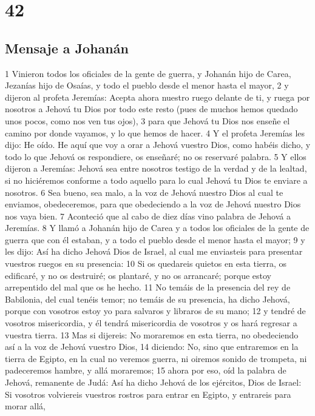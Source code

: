 \chapter{42}

\section*{Mensaje a Johanán}

1 Vinieron todos los oficiales de la gente de guerra, y Johanán hijo de Carea, Jezanías hijo de Osaías, y todo el pueblo desde el menor hasta el mayor,
2 y dijeron al profeta Jeremías: Acepta ahora nuestro ruego delante de ti, y ruega por nosotros a Jehová tu Dios por todo este resto (pues de muchos hemos quedado unos pocos, como nos ven tus ojos),
3 para que Jehová tu Dios nos enseñe el camino por donde vayamos, y lo que hemos de hacer.
4 Y el profeta Jeremías les dijo: He oído. He aquí que voy a orar a Jehová vuestro Dios, como habéis dicho, y todo lo que Jehová os respondiere, os enseñaré; no os reservaré palabra.
5 Y ellos dijeron a Jeremías: Jehová sea entre nosotros testigo de la verdad y de la lealtad, si no hiciéremos conforme a todo aquello para lo cual Jehová tu Dios te enviare a nosotros.
6 Sea bueno, sea malo, a la voz de Jehová nuestro Dios al cual te enviamos, obedeceremos, para que obedeciendo a la voz de Jehová nuestro Dios nos vaya bien. 
7 Aconteció que al cabo de diez días vino palabra de Jehová a Jeremías.
8 Y llamó a Johanán hijo de Carea y a todos los oficiales de la gente de guerra que con él estaban, y a todo el pueblo desde el menor hasta el mayor;
9 y les dijo: Así ha dicho Jehová Dios de Israel, al cual me enviasteis para presentar vuestros ruegos en su presencia:
10 Si os quedareis quietos en esta tierra, os edificaré, y no os destruiré; os plantaré, y no os arrancaré; porque estoy arrepentido del mal que os he hecho.
11 No temáis de la presencia del rey de Babilonia, del cual tenéis temor; no temáis de su presencia, ha dicho Jehová, porque con vosotros estoy yo para salvaros y libraros de su mano;
12 y tendré de vosotros misericordia, y él tendrá misericordia de vosotros y os hará regresar a vuestra tierra.
13 Mas si dijereis: No moraremos en esta tierra, no obedeciendo así a la voz de Jehová vuestro Dios,
14 diciendo: No, sino que entraremos en la tierra de Egipto, en la cual no veremos guerra, ni oiremos sonido de trompeta, ni padeceremos hambre, y allá moraremos;
15 ahora por eso, oíd la palabra de Jehová, remanente de Judá: Así ha dicho Jehová de los ejércitos, Dios de Israel: Si vosotros volviereis vuestros rostros para entrar en Egipto, y entrareis para morar allá,
